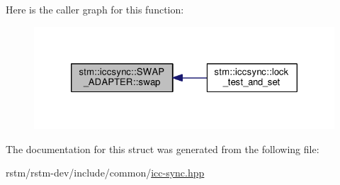 Here is the caller graph for this function\-:
\nopagebreak
\begin{figure}[H]
\begin{center}
\leavevmode
\includegraphics[width=324pt]{structstm_1_1iccsync_1_1SWAP__ADAPTER_a7c21866c3951b11ad255924e1bf28f1f_icgraph}
\end{center}
\end{figure}




The documentation for this struct was generated from the following file\-:\begin{DoxyCompactItemize}
\item 
rstm/rstm-\/dev/include/common/\hyperlink{icc-sync_8hpp}{icc-\/sync.\-hpp}\end{DoxyCompactItemize}
